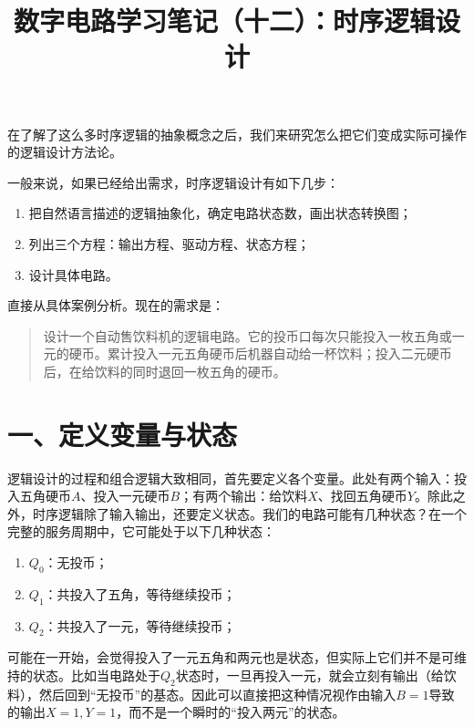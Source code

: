 \documentclass[UTF8]{ctexart}
\title{数字电路学习笔记（十二）：时序逻辑设计}
\begin{document}
\maketitle
在了解了这么多时序逻辑的抽象概念之后，我们来研究怎么把它们变成实际可操作的逻辑设计方法论。

一般来说，如果已经给出需求，时序逻辑设计有如下几步：
\begin{enumerate}
\item 把自然语言描述的逻辑抽象化，确定电路状态数，画出状态转换图；
\item 列出三个方程：输出方程、驱动方程、状态方程；
\item 设计具体电路。
\end{enumerate}

直接从具体案例分析。现在的需求是：
\begin{quote}
设计一个自动售饮料机的逻辑电路。它的投币口每次只能投入一枚五角或一元的硬币。累计投入一元五角硬币后机器自动给一杯饮料；投入二元硬币后，在给饮料的同时退回一枚五角的硬币。 \cite{Q1}
\end{quote}

\section*{一、定义变量与状态}
逻辑设计的过程和组合逻辑大致相同，首先要定义各个变量。此处有两个输入：投入五角硬币$A$、投入一元硬币$B$；有两个输出：给饮料$X$、找回五角硬币$Y$。除此之外，时序逻辑除了输入输出，还要定义状态。我们的电路可能有几种状态？在一个完整的服务周期中，它可能处于以下几种状态：
\begin{enumerate}
\item $Q_0$：无投币；
\item $Q_1$：共投入了五角，等待继续投币；
\item $Q_2$：共投入了一元，等待继续投币；
\end{enumerate}

可能在一开始，会觉得投入了一元五角和两元也是状态，但实际上它们并不是可维持的状态。比如当电路处于$Q_2$状态时，一旦再投入一元，就会立刻有输出（给饮料），然后回到“无投币”的基态。因此可以直接把这种情况视作由输入$B=1$导致的输出$X=1,Y=1$，而不是一个瞬时的“投入两元”的状态。
\end{document}
